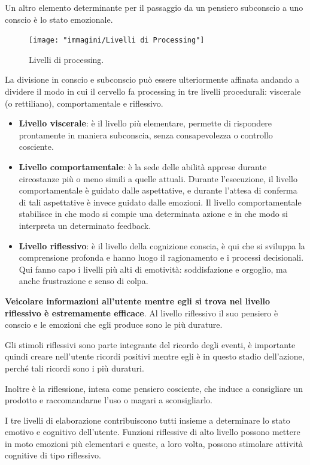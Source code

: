 Un altro elemento determinante per il passaggio da un pensiero subconscio a uno conscio è lo stato emozionale.

\begin{figure}[!h]
	\centering
	\texttt{[image: "immagini/Livelli di Processing"]}
	\caption{Livelli di processing.}
\end{figure}

La divisione in conscio e subconscio può essere ulteriormente affinata andando a dividere il modo in cui il cervello fa processing in tre livelli
procedurali: viscerale (o rettiliano), comportamentale e riflessivo.

\begin{itemize}
	\itemsep-0.3em
	\item \textbf{Livello viscerale}: è il livello più elementare, permette di rispondere prontamente in maniera subconscia, senza consapevolezza o
	controllo cosciente.
	\item \textbf{Livello comportamentale}: è la sede delle abilità apprese durante circostanze più o meno simili a quelle attuali. Durante l'esecuzione,
	il livello comportamentale è guidato dalle aspettative, e durante l'attesa di conferma di tali aspettative è invece guidato dalle emozioni. Il livello
	comportamentale stabilisce in che modo si compie una determinata azione e in che modo si interpreta un determinato feedback.
	\item \textbf{Livello riflessivo}: è il livello della cognizione conscia, è qui che si sviluppa la comprensione profonda e hanno luogo il ragionamento
	e i processi decisionali. Qui fanno capo i livelli più alti di emotività: soddisfazione e orgoglio, ma anche frustrazione e senso di colpa.
\end{itemize}

\textbf{Veicolare informazioni all'utente mentre egli si trova nel livello riflessivo è estremamente efficace}. Al livello riflessivo il suo pensiero
è conscio e le emozioni che egli produce sono le più durature.

Gli stimoli riflessivi sono parte integrante del ricordo degli eventi, è importante quindi creare nell'utente ricordi positivi mentre egli è in questo
stadio dell'azione, perché tali ricordi sono i più duraturi.

Inoltre è la riflessione, intesa come pensiero cosciente, che induce a consigliare un prodotto e raccomandarne l'uso o magari a sconsigliarlo.

I tre livelli di elaborazione contribuiscono tutti insieme a determinare lo stato emotivo e cognitivo dell'utente. Funzioni riflessive di alto livello
possono mettere in moto emozioni più elementari e  queste, a loro volta, possono stimolare attività cognitive di tipo riflessivo.